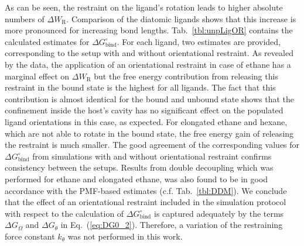 \documentclass[9pt,lessons,pubversion]{livecoms}
\begin{document}
%
As can be seen, the restraint on the ligand's rotation leads to higher absolute numbers of $\Delta W_\mathrm{R}$.
Comparison of the diatomic ligands shows that this increase is more pronounced for increasing bond lengths.
Tab.~\ref{tbl:unpLigOR} contains the calculated estimates for $\Delta G^\circ_\mathrm{bind}$. 
For each ligand, two estimates are provided, corresponding to the setup with and without orientational restraint. 
As revealed by the data, the application of an orientational restraint in case of ethane has a marginal effect on $\Delta W_\mathrm{R}$ but the free energy contribution from releasing this restraint in the bound state is the highest for all ligands.
The fact that this contribution is almost identical for the bound and unbound state shows that the confinement inside the host's cavity has no significant effect on the populated ligand orientations in this case, as expected.
For elongated ethane and hexane, which are not able to rotate in the bound state, the free energy gain of releasing the restraint is much smaller.
The good agreement of the corresponding values for $\Delta G^\circ_\mathrm{bind}$ from simulations with and without orientational restraint confirms consistency between the setups. 
Results from double decoupling which was performed for ethane and elongated ethane, was also found to be in good accordance with the PMF-based estimates (c.f. Tab.~\ref{tbl:DDM}).
We conclude that the effect of an orientational restraint included in the simulation protocol with respect to the calculation of $\Delta G^\circ_\mathrm{bind}$ is captured adequately by the terms $\Delta G_\Omega$ and 
$\Delta G_\theta$ in Eq.~(\ref{eq:DG0_2}).
Therefore, a variation of the restraining force constant $k_\theta$ was not performed in this work.
\end{document}
